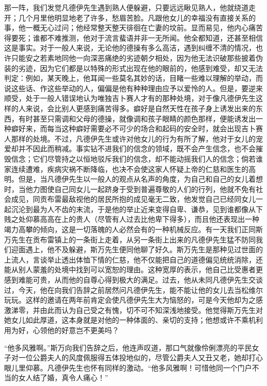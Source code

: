 \par 那一阵，我们发觉凡德伊先生遇到熟人便躲避，只要远远瞅见熟人，他就绕道走开；几个月里他明显地老了许多，愁眉苦脸。凡跟他女儿的幸福没有直接关系的事，他一概无心过问；他经常整天整天徘徊在亡妻的坟前。显而易见，他内心痛苦得要死；谁都不难推测，他对于流言蜚语并非一无所闻。他全都知道，还甚至相信这是事实。对于一般人来说，无论他的德操有多么高洁，遇到纠缠不清的情况，也许只能安之若素地同他一向深恶痛绝的劣迹朝夕相处，因为他无法识破那些披着伪装的劣迹，因为它们都是以特殊的形式出现在他的眼前的，他感到难受，却又无法判定：例如，某天晚上，他耳闻一些莫名其妙的话，目睹一些难以理解的举动，而说这些话、作这些举动的人，偏偏是他有种种理由应予以爱怜的人。但是，要逆来顺受，处于一般人错误地认为唯独吉卜赛人才有的那种处境，对于像凡德伊先生这样的人来说，会比别人更感到痛苦得多。癖好是自然天性在孩子身上诱发出来的东西，有时甚至只需调和父母的德操，就像调和孩子眼睛的颜色那样，便能诱发出一种癖好来，而每当这种癖好需要必不可少的场合和起码的安全时，就会出现吉卜赛人那样的处境。不过，凡德伊先生或许对他女儿的行为有所了解，他对于女儿的宠爱却并不因此而稍减。事实钻不进我们的信念的领域，既不会产生信念，也不会摧毁信念；它们尽管持之以恒地驳斥我们的信念，却不能动摇我们人的信念；倘若谁家连续遭难，疾病灾祸不断降临，也决不会使这家人怀疑上帝的仁慈和医生的高明。但是，当凡德伊先生以一般人的观点从名声的角度，为自己和自己的女儿着想时，当他力图使自己同女儿一起跻身于受到普遍尊敬的人们的行列，他就不免有社会成见，同贡布雷最敌视他的居民所抱的成见毫无二致，他发觉自己已经同女儿一起沉沦到最为人不齿的末流，于是他的举止近来变得自卑、谦恭，见到谁都像从下贱之处仰慕高高在上的贵人（尽管有人过去比他卑下得多），而且他还表现出一种竭力高攀的倾向，这是一切落魄的人必然会有的一种机械反应。有一天我们正同斯万先生在贡布雷镇上的一条街上走着，从另一条街上出来的凡德伊先生猛不防同我们迎面遇上，他不及躲避，斯万先生便同他聊了好久。斯万先生是那种见过世面的上流人，言谈举止透出体恤下情的仁慈，他不仅能把自己的道德偏见统统消除，还能从别人蒙羞的处境中找到可以宽恕的理由。这种宽厚的表示，他自己比受惠者更感到难能可贵，从而他的自尊心得到极大的满足。过去，他从未同凡德伊先生交谈过，今天，他在向我们告辞之前居然问凡德伊先生，能不能让他的女儿去当松维尔玩玩。这样的邀请在两年前肯定会使凡德伊先生大为恼怒的，可是今天他却为之感激涕零，并由此而认为自己受之有愧，切不可不知深浅地接受。他觉得斯万先生对她女儿如此厚道，这本身就是对他的一种体面的、亲切的支持；他想或许不乘机利用为好，心领他的好意岂不更美吗？
\par “他多风雅啊。”斯万向我们告辞之后，他连声叹道，那口气就像伶俐漂亮的平民女子对一位公爵夫人的风度佩服得五体投地似的，尽管公爵夫人又丑又老，她却打心眼儿里仰慕。凡德伊先生也怀有同样的激动。“他多风雅啊！可惜他同一个门户不当的女人结了婚，真令人痛心！”
